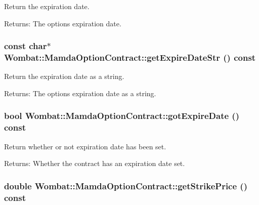 Return the expiration date. 

\begin{Desc}
\item[Returns:]The options expiration date. \end{Desc}
\hypertarget{classWombat_1_1MamdaOptionContract_cb83dd5c1f8ceced6744ba3a44fc0d65}{
\subsubsection[getExpireDateStr]{\setlength{\rightskip}{0pt plus 5cm}const char$\ast$ Wombat::Mamda\-Option\-Contract::get\-Expire\-Date\-Str () const}}
\label{classWombat_1_1MamdaOptionContract_cb83dd5c1f8ceced6744ba3a44fc0d65}


Return the expiration date as a string. 

\begin{Desc}
\item[Returns:]The options expiration date as a string. \end{Desc}
\hypertarget{classWombat_1_1MamdaOptionContract_8657f2b6fa3ce16032522a460e657387}{
\subsubsection[gotExpireDate]{\setlength{\rightskip}{0pt plus 5cm}bool Wombat::Mamda\-Option\-Contract::got\-Expire\-Date () const}}
\label{classWombat_1_1MamdaOptionContract_8657f2b6fa3ce16032522a460e657387}


Return whether or not expiration date has been set. 

\begin{Desc}
\item[Returns:]Whether the contract has an expiration date set. \end{Desc}
\hypertarget{classWombat_1_1MamdaOptionContract_d9d9e836fab85c7b7dc0401020dd6f46}{
\subsubsection[getStrikePrice]{\setlength{\rightskip}{0pt plus 5cm}double Wombat::Mamda\-Option\-Contract::get\-Strike\-Price () const}}
\label{classWombat_1_1MamdaOptionContract_d9d9e836fab85c7b7dc0401020dd6f46}


